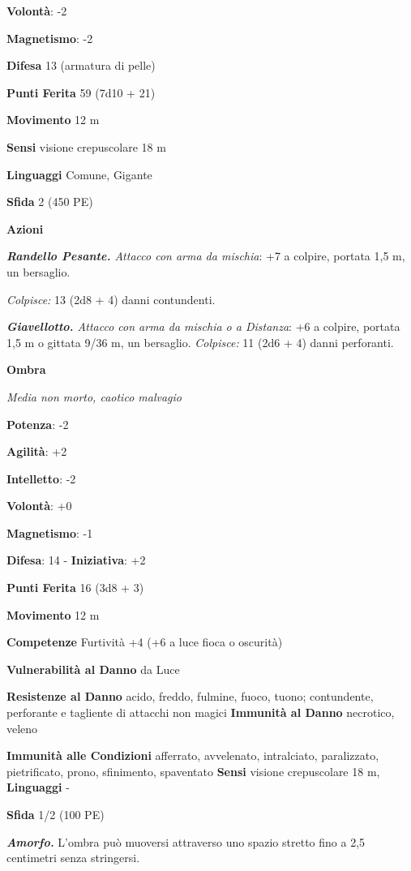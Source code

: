 \begin{multicols}{2}
\textbf{Volontà}: -2

\textbf{Magnetismo}: -2

\textbf{Difesa} 13 (armatura di pelle)

\textbf{Punti Ferita} 59 (7d10 + 21)

\textbf{Movimento} 12 m

\textbf{Sensi} visione crepuscolare 18 m

\textbf{Linguaggi} Comune, Gigante

\textbf{Sfida} 2 (450 PE)

\textbf{Azioni}

\emph{\textbf{Randello Pesante.} Attacco con arma da mischia}: +7 a
colpire, portata 1,5 m, un bersaglio.

\emph{Colpisce:} 13 (2d8 + 4) danni contundenti.

\emph{\textbf{Giavellotto.} Attacco con arma da mischia o a Distanza}:
+6 a colpire, portata 1,5 m o gittata 9/36 m, un bersaglio.
\emph{Colpisce:} 11 (2d6 + 4) danni perforanti.

\textbf{Ombra}

\emph{Media non morto, caotico malvagio}

\textbf{Potenza}: -2

\textbf{Agilità}: +2

\textbf{Intelletto}: -2

\textbf{Volontà}: +0

\textbf{Magnetismo}: -1

\textbf{Difesa}: 14 - \textbf{Iniziativa}: +2

\textbf{Punti Ferita} 16 (3d8 + 3)

\textbf{Movimento} 12 m

\textbf{Competenze} Furtività +4 (+6 a luce fioca o oscurità)

\textbf{Vulnerabilità al Danno} da Luce

\textbf{Resistenze al Danno} acido, freddo, fulmine, fuoco, tuono;
contundente, perforante e tagliente di attacchi non magici
\textbf{Immunità al Danno} necrotico, veleno

\textbf{Immunità alle Condizioni} afferrato, avvelenato, intralciato,
paralizzato, pietrificato, prono, sfinimento, spaventato \textbf{Sensi}
visione crepuscolare 18 m,  \textbf{Linguaggi} -

\textbf{Sfida} 1/2 (100 PE)

\emph{\textbf{Amorfo.}} L'ombra può muoversi attraverso uno spazio
stretto fino a 2,5 centimetri senza stringersi.


\end{multicols}
